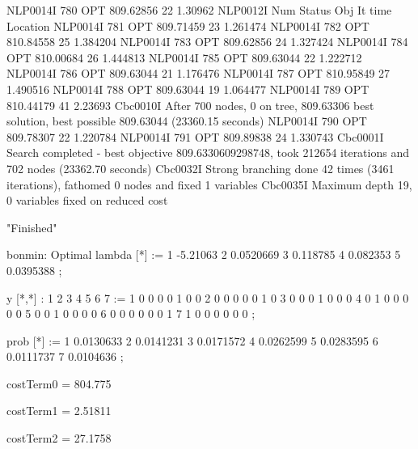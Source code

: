 NLP0014I           780         OPT 809.62856       22 1.30962
NLP0012I 
              Num      Status      Obj             It       time                 Location
NLP0014I           781         OPT 809.71459       23 1.261474
NLP0014I           782         OPT 810.84558       25 1.384204
NLP0014I           783         OPT 809.62856       24 1.327424
NLP0014I           784         OPT 810.00684       26 1.444813
NLP0014I           785         OPT 809.63044       22 1.222712
NLP0014I           786         OPT 809.63044       21 1.176476
NLP0014I           787         OPT 810.95849       27 1.490516
NLP0014I           788         OPT 809.63044       19 1.064477
NLP0014I           789         OPT 810.44179       41 2.23693
Cbc0010I After 700 nodes, 0 on tree, 809.63306 best solution, best possible 809.63044 (23360.15 seconds)
NLP0014I           790         OPT 809.78307       22 1.220784
NLP0014I           791         OPT 809.89838       24 1.330743
Cbc0001I Search completed - best objective 809.6330609298748, took 212654 iterations and 702 nodes (23362.70 seconds)
Cbc0032I Strong branching done 42 times (3461 iterations), fathomed 0 nodes and fixed 1 variables
Cbc0035I Maximum depth 19, 0 variables fixed on reduced cost

 	"Finished"

bonmin: Optimal
lambda [*] :=
1  -5.21063
2   0.0520669
3   0.118785
4   0.082353
5   0.0395388
;

y [*,*]
:   1   2   3   4   5   6   7    :=
1   0   0   0   0   1   0   0
2   0   0   0   0   0   1   0
3   0   0   0   1   0   0   0
4   0   1   0   0   0   0   0
5   0   0   1   0   0   0   0
6   0   0   0   0   0   0   1
7   1   0   0   0   0   0   0
;

prob [*] :=
1  0.0130633
2  0.0141231
3  0.0171572
4  0.0262599
5  0.0283595
6  0.0111737
7  0.0104636
;

costTerm0 = 804.775

costTerm1 = 2.51811

costTerm2 = 27.1758


